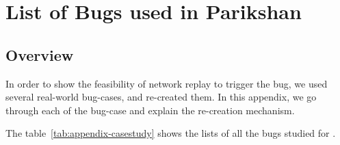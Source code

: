 \chapter{List of Bugs used in Parikshan}

\section{Overview}

In order to show the feasibility of network replay to trigger the bug, we used several real-world bug-cases, and re-created them. In this appendix, we go through each of the bug-case and explain the re-creation mechanism.

The table~\ref{tab:appendix-casestudy} shows the lists of all the bugs studied for \parikshan.

\begin{table*}[ht]
	\centering
	\footnotesize
	

\end{table*}
